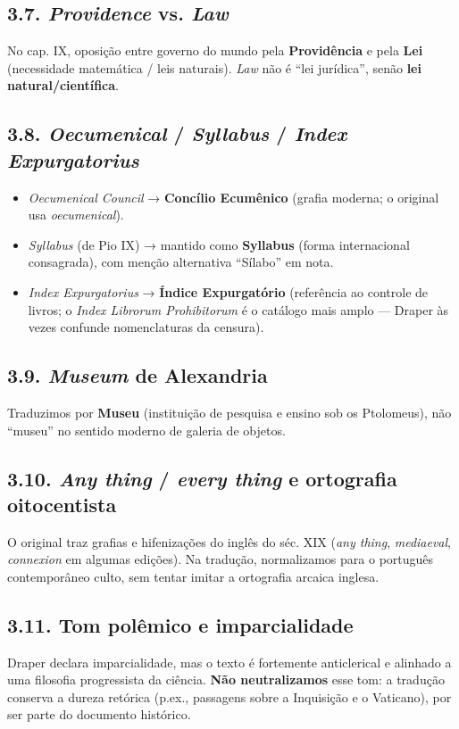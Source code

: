 \documentclass[11pt,a5paper,twoside,openany]{book}
\begin{document}
\subsection*{3.7. \textit{Providence} vs. \textit{Law}}
No cap. IX, oposição entre governo do mundo pela \textbf{Providência} e pela \textbf{Lei} (necessidade matemática / leis naturais). \textit{Law} não é “lei jurídica”, senão \textbf{lei natural/científica}.

\subsection*{3.8. \textit{Oecumenical} / \textit{Syllabus} / \textit{Index Expurgatorius}}
\begin{itemize}
\item \textit{Oecumenical Council} → \textbf{Concílio Ecumênico} (grafia moderna; o original usa \textit{oecumenical}).
\item \textit{Syllabus} (de Pio IX) → mantido como \textbf{Syllabus} (forma internacional consagrada), com menção alternativa “Sílabo” em nota.
\item \textit{Index Expurgatorius} → \textbf{Índice Expurgatório} (referência ao controle de livros; o \textit{Index Librorum Prohibitorum} é o catálogo mais amplo — Draper às vezes confunde nomenclaturas da censura).
\end{itemize}
\subsection*{3.9. \textit{Museum} de Alexandria}
Traduzimos por \textbf{Museu} (instituição de pesquisa e ensino sob os Ptolomeus), não “museu” no sentido moderno de galeria de objetos.

\subsection*{3.10. \textit{Any thing} / \textit{every thing} e ortografia oitocentista}
O original traz grafias e hifenizações do inglês do séc. XIX (\textit{any thing}, \textit{mediaeval}, \textit{connexion} em algumas edições). Na tradução, normalizamos para o português contemporâneo culto, sem tentar imitar a ortografia arcaica inglesa.

\subsection*{3.11. Tom polêmico e imparcialidade}
Draper declara imparcialidade, mas o texto é fortemente anticlerical e alinhado a uma filosofia progressista da ciência. \textbf{Não neutralizamos} esse tom: a tradução conserva a dureza retórica (p.ex., passagens sobre a Inquisição e o Vaticano), por ser parte do documento histórico.
\end{document}
